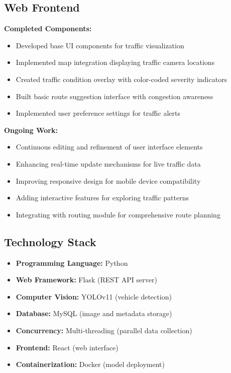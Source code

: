 \subsection{Web Frontend}

\textbf{Completed Components:}
\begin{itemize}
    \item Developed base UI components for traffic visualization
    \item Implemented map integration displaying traffic camera locations
    \item Created traffic condition overlay with color-coded severity indicators
    \item Built basic route suggestion interface with congestion awareness
    \item Implemented user preference settings for traffic alerts
\end{itemize}

\textbf{Ongoing Work:}
\begin{itemize}
    \item Continuous editing and refinement of user interface elements
    \item Enhancing real-time update mechanisms for live traffic data
    \item Improving responsive design for mobile device compatibility
    \item Adding interactive features for exploring traffic patterns
    \item Integrating with routing module for comprehensive route planning
\end{itemize}

\subsection{Technology Stack}

\begin{itemize}
    \item \textbf{Programming Language:} Python
    \item \textbf{Web Framework:} Flask (REST API server)
    \item \textbf{Computer Vision:} YOLOv11 (vehicle detection)
    \item \textbf{Database:} MySQL (image and metadata storage)
    \item \textbf{Concurrency:} Multi-threading (parallel data collection)
    \item \textbf{Frontend:} React (web interface)
    \item \textbf{Containerization:} Docker (model deployment)
\end{itemize}

